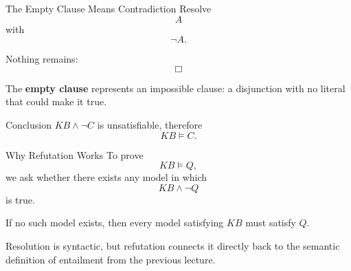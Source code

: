 \documentclass[aspectratio=169,10pt]{beamer}
\begin{document}
\begin{frame}[shrink=8]{The Empty Clause Means Contradiction}
  Resolve
  \[
    A
  \]
  with
  \[
    \neg A.
  \]

  Nothing remains:
  \[
    \Box
  \]

  The \textbf{empty clause} represents an impossible clause: a disjunction with no literal that could make it true.

  \begin{block}{Conclusion}
    $KB \land \neg C$ is unsatisfiable, therefore
    \[
      KB \models C.
    \]
  \end{block}
\end{frame}

\begin{frame}[shrink=10]{Why Refutation Works}
  To prove
  \[
    KB \models Q,
  \]
  we ask whether there exists any model in which
  \[
    KB \land \neg Q
  \]
  is true.

  If no such model exists, then every model satisfying $KB$ must satisfy $Q$.

  \begin{keyidea}
    Resolution is syntactic, but refutation connects it directly back to the semantic definition of entailment from the previous lecture.
  \end{keyidea}
\end{frame}
\end{document}
